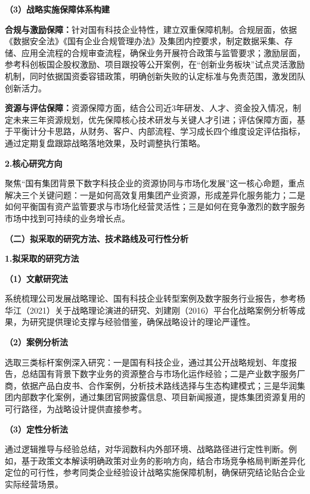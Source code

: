 \documentclass[UTF8, a4paper, 11pt]{ctexart}
\begin{document}
\begin{UnifiedBox}
\noindent \textbf{（3）战略实施保障体系构建}

\noindent \textbf{合规与激励保障：}针对国有科技企业特性，建立双重保障机制。合规层面，依据《数据安全法》《国有企业合规管理办法》及集团内控要求，制定数据采集、存储、应用全流程的合规审查流程，确保业务开展符合政策与监管要求；激励层面，参考科创板国企股权激励、项目跟投等公开案例，在``创新业务板块''试点灵活激励机制，同时依据国资委容错政策，明确创新失败的认定标准与免责范围，激发团队创新活力。

\noindent \textbf{资源与评估保障：}资源保障方面，结合公司近3年研发、人才、资金投入情况，制定未来三年资源规划，优先保障核心技术研发与关键人才引进；评估保障方面，基于平衡计分卡思路，从财务、客户、内部流程、学习成长四个维度设定评估指标，通过定期复盘跟踪战略落地效果，及时调整执行策略。

\vspace{0.3cm}
\noindent \textbf{2.核心研究方向}

聚焦``国有集团背景下数字科技企业的资源协同与市场化发展''这一核心命题，重点解决三个关键问题：一是如何高效复用集团产业资源，形成差异化服务能力；二是如何平衡国有资产监管要求与市场化经营灵活性；三是如何在竞争激烈的数字服务市场中找到可持续的业务增长点。

\vspace{0.5cm}
\noindent \textbf{（二）拟采取的研究方法、技术路线及可行性分析}

\vspace{0.2cm}
\noindent \textbf{1.拟采取的研究方法}

\vspace{0.2cm}
\noindent \textbf{（1）文献研究法}

系统梳理公司发展战略理论、国有科技企业转型案例及数字服务行业报告，参考杨华江（2021）关于战略理论演进的研究、刘建刚（2016）平台化战略案例分析等成果，为研究提供理论支撑与经验借鉴，确保战略设计的理论严谨性。

\vspace{0.2cm}
\noindent \textbf{（2）案例分析法}

选取三类标杆案例深入研究：一是国有科技企业，通过其公开战略规划、年度报告，总结国有背景下数字业务的资源整合与市场化运作经验；二是产业数字服务厂商，依据产品白皮书、合作案例，分析技术路线选择与生态构建模式；三是华润集团内部数字化案例，通过集团官网披露信息、项目新闻报道，提炼集团资源复用的可行路径，为战略设计提供直接参考。

\vspace{0.2cm}
\noindent \textbf{（3）定性分析法}

通过逻辑推导与经验总结，对华润数科内外部环境、战略路径进行定性判断。例如，基于政策文本解读明确政策对业务的影响方向，结合市场竞争格局判断差异化定位的可行性，参考同类企业经验设计战略实施保障机制，确保研究结论贴合企业实际经营场景。


\end{UnifiedBox}
\end{document}
